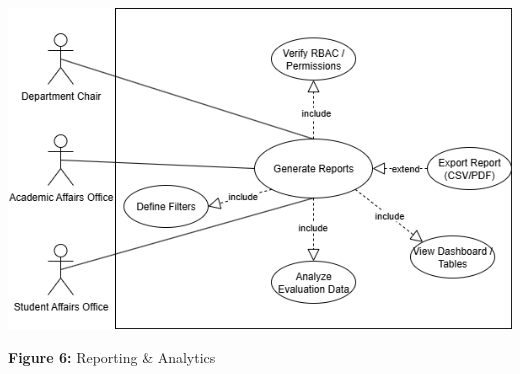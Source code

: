 

\begin{center}
\includegraphics[width=0.9\linewidth]{images/UC-05.png}
\end{center}

\begin{center}
\textbf{Figure 6:}  Reporting \& Analytics
\end{center}

